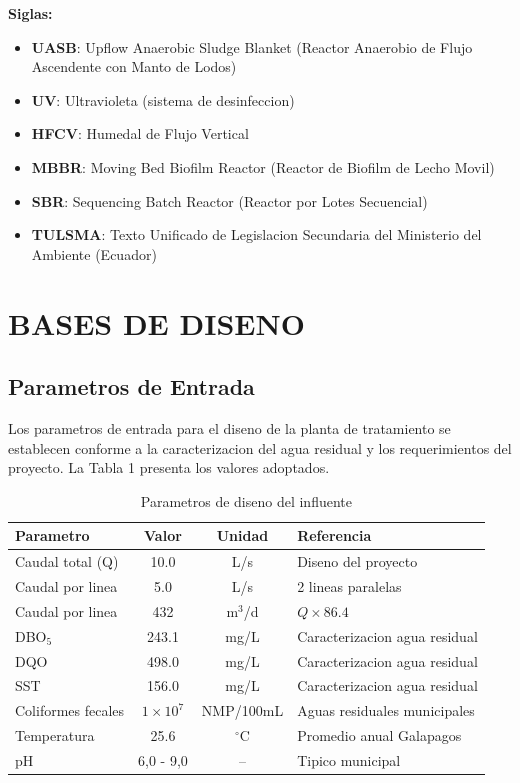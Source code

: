 \documentclass[12pt,a4paper]{article}
\begin{document}
\textbf{Siglas:}
\begin{itemize}
    \item \textbf{UASB}: Upflow Anaerobic Sludge Blanket (Reactor Anaerobio de Flujo Ascendente con Manto de Lodos)
    \item \textbf{UV}: Ultravioleta (sistema de desinfeccion)
    \item \textbf{HFCV}: Humedal de Flujo Vertical
    \item \textbf{MBBR}: Moving Bed Biofilm Reactor (Reactor de Biofilm de Lecho Movil)
    \item \textbf{SBR}: Sequencing Batch Reactor (Reactor por Lotes Secuencial)
    \item \textbf{TULSMA}: Texto Unificado de Legislacion Secundaria del Ministerio del Ambiente (Ecuador)
\end{itemize}

\newpage
\section{BASES DE DISENO}

\subsection{Parametros de Entrada}

Los parametros de entrada para el diseno de la planta de tratamiento se 
establecen conforme a la caracterizacion del agua residual y los requerimientos 
del proyecto. La Tabla 1 presenta los valores adoptados.

\begin{table}[H]
\centering
\caption{Parametros de diseno del influente}
\begin{tabular}{p{4.5cm}ccp{4cm}}
\toprule
\textbf{Parametro} & \textbf{Valor} & \textbf{Unidad} & \textbf{Referencia} \\
\midrule
Caudal total (Q) & 10.0 & L/s & Diseno del proyecto \\
Caudal por linea & 5.0 & L/s & 2 lineas paralelas \\
Caudal por linea & 432 & m$^3$/d & $Q \times 86.4$ \\
DBO$_5$ & 243.1 & mg/L & Caracterizacion agua residual \\
DQO & 498.0 & mg/L & Caracterizacion agua residual \\
SST & 156.0 & mg/L & Caracterizacion agua residual \\
Coliformes fecales & $1 \times 10^7$ & NMP/100mL & Aguas residuales municipales \\
Temperatura & 25.6 & $^\circ$C & Promedio anual Galapagos \\
pH & 6,0 - 9,0 & -- & Tipico municipal \\
\bottomrule
\end{tabular}
\label{tab:parametros_entrada}
\end{table}
\end{document}
